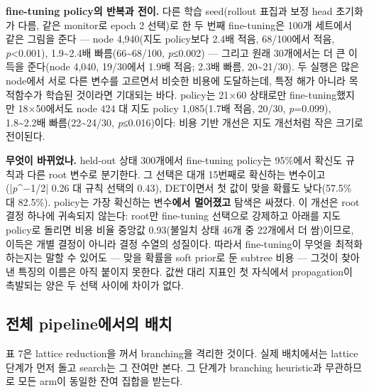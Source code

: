 \documentclass[final,5p,twocolumn]{elsarticle}
\begin{document}
\textbf{fine-tuning policy의 반복과 전이.} 다른 학습 seed(rollout 표집과 보정 head 초기화가 다름, 같은 monitor로 epoch 2 선택)로 한 두 번째 fine-tuning은 100개 세트에서 같은 그림을 준다 — node 4,940(지도 policy보다 2.4배 적음, 68/100에서 적음, \textit{p}<0.001), 1.9\textasciitilde{}2.4배 빠름(66\textasciitilde{}68/100, \textit{p}≤0.002) — 그리고 원래 30개에서는 더 큰 이득을 준다(node 4,040, 19/30에서 1.9배 적음; 2.3배 빠름, 20\textasciitilde{}21/30). 두 실행은 많은 node에서 서로 다른 변수를 고르면서 비슷한 비용에 도달하는데, 특정 해가 아니라 목적함수가 학습된 것이라면 기대되는 바다. policy는 21×60 상태로만 fine-tuning했지만 18×50에서도 node 424 대 지도 policy 1,085(1.7배 적음, 20/30, \textit{p}=0.099), 1.8\textasciitilde{}2.2배 빠름(22\textasciitilde{}24/30, \textit{p}≤0.016)이다: 비용 기반 개선은 지도 개선처럼 작은 크기로 전이된다.

\textbf{무엇이 바뀌었나.} held-out 상태 300개에서 fine-tuning policy는 95\%에서 확신도 규칙과 다른 root 변수로 분기한다. 그 선택은 대개 15번째로 확신하는 변수이고(|\textit{p}\^{}−1/2| 0.26 대 규칙 선택의 0.43), DET이면서 첫 값이 맞을 확률도 낮다(57.5\% 대 82.5\%). policy는 가장 확신하는 변수\textbf{에서 멀어졌고} 탐색은 싸졌다. 이 개선은 root 결정 하나에 귀속되지 않는다: root만 fine-tuning 선택으로 강제하고 아래를 지도 policy로 돌리면 비용 비율 중앙값 0.93(불일치 상태 46개 중 22개에서 더 쌈)이므로, 이득은 개별 결정이 아니라 결정 수열의 성질이다. 따라서 fine-tuning이 무엇을 최적화하는지는 말할 수 있어도 — 맞을 확률을 soft prior로 둔 subtree 비용 — 그것이 찾아낸 특징의 이름은 아직 붙이지 못한다. 값싼 대리 지표인 첫 자식에서 propagation이 촉발되는 양은 두 선택 사이에 차이가 없다.

\subsection{전체 pipeline에서의 배치}
표 7은 lattice reduction을 꺼서 branching을 격리한 것이다. 실제 배치에서는 lattice 단계가 먼저 돌고 search는 그 잔여만 본다. 그 단계가 branching heuristic과 무관하므로 모든 arm이 동일한 잔여 집합을 받는다.
\end{document}
